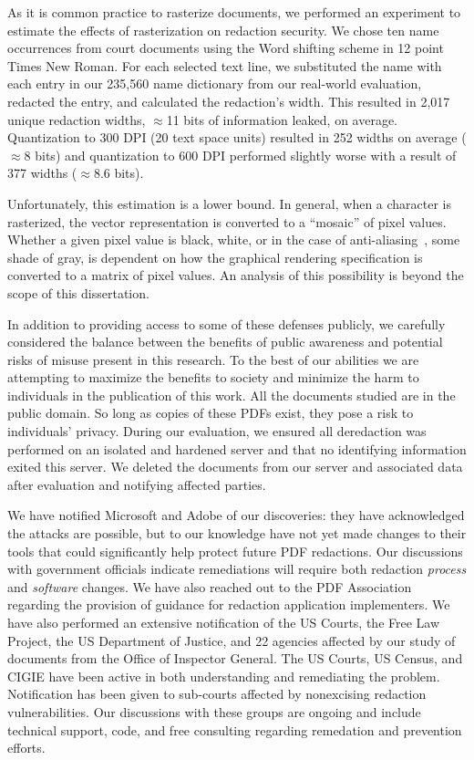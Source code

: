 As it is common practice to rasterize documents, we performed an experiment to estimate the effects of rasterization on redaction security.
We chose ten name occurrences from court documents using the Word shifting scheme in 12 point Times New Roman.
For each selected text line, we substituted the name with each entry in our 235,560 name dictionary from our real-world evaluation, redacted the entry, and calculated the redaction's width.
This resulted in 2,017 unique redaction widths, $\approx$11 bits of information leaked, on average.
Quantization to 300 DPI (20 text space units) resulted in 252 widths on average ($\approx$8 bits) and quantization to 600 DPI performed slightly worse with a result of 377 widths ($\approx$8.6 bits).

Unfortunately, this estimation is a lower bound.
In general, when a character is rasterized, the vector representation is converted to a ``mosaic'' of pixel values.
Whether a given pixel value is black, white, or in the case of anti-aliasing~\cite{romanyuk2015method}, some shade of gray, is dependent on how the graphical rendering specification is converted to a matrix of pixel values.
An analysis of this possibility is beyond the scope of this dissertation.

In addition to providing access to some of these defenses publicly, we carefully considered the balance between the benefits of public awareness and potential risks of misuse present in this research.
To the best of our abilities we are attempting to maximize the benefits to society and minimize the harm to individuals in the publication of this work.
All the documents studied are in the public domain.
So long as copies of these PDFs exist, they pose a risk to individuals' privacy.
During our evaluation, we ensured all deredaction was performed on an isolated and hardened server and that no identifying information exited this server.
We deleted the documents from our server and associated data after evaluation and notifying affected parties.

We have notified Microsoft and Adobe of our discoveries: they have acknowledged the attacks are possible, but to our knowledge have not yet made changes to their tools that could significantly help protect future PDF redactions.
Our discussions with government officials indicate remediations will require both redaction \emph{process} and \emph{software} changes.
We have also reached out to the PDF Association regarding the provision of guidance for redaction application implementers.
We have also performed an extensive notification of the US Courts, the Free Law Project, the US Department of Justice, and 22 agencies affected by our study of documents from the Office of Inspector General.
The US Courts, US Census, and CIGIE have been active in both understanding and remediating the problem.
Notification has been given to sub-courts affected by nonexcising redaction vulnerabilities.
Our discussions with these groups are ongoing and include technical support, code, and free consulting regarding remedation and prevention efforts.

